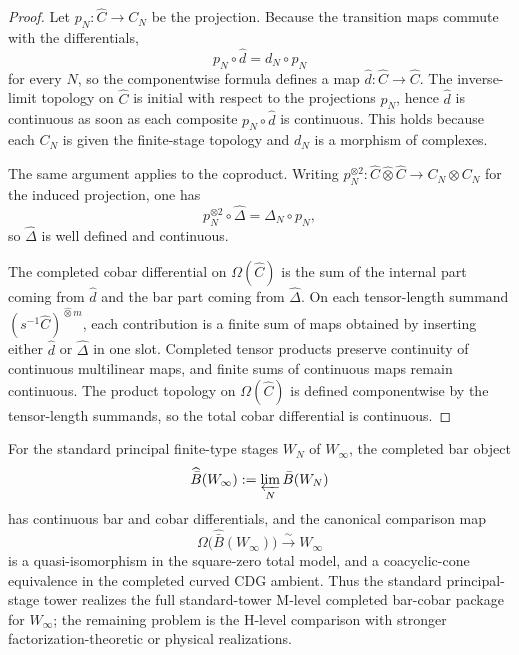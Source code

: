 \begin{proof}
Let $p_N\colon \widehat C \to C_N$ be the projection. Because the
transition maps commute with the differentials,
\[
p_N \circ \widehat d = d_N \circ p_N
\]
for every $N$, so the componentwise formula defines a map
$\widehat d\colon \widehat C \to \widehat C$. The inverse-limit
topology on $\widehat C$ is initial with respect to the projections
$p_N$, hence $\widehat d$ is continuous as soon as each composite
$p_N \circ \widehat d$ is continuous. This holds because each $C_N$ is
given the finite-stage topology and $d_N$ is a morphism of complexes.

The same argument applies to the coproduct. Writing
$p_N^{\otimes 2}\colon \widehat C \widehat\otimes \widehat C \to
C_N\otimes C_N$ for the induced projection, one has
\[
p_N^{\otimes 2} \circ \widehat\Delta = \Delta_N \circ p_N,
\]
so $\widehat\Delta$ is well defined and continuous.

The completed cobar differential on $\Omega(\widehat C)$ is the sum of
the internal part coming from $\widehat d$ and the bar part coming from
$\widehat\Delta$. On each tensor-length summand
$(s^{-1}\widehat C)^{\widehat\otimes m}$, each contribution is a finite
sum of maps obtained by inserting either $\widehat d$ or
$\widehat\Delta$ in one slot. Completed tensor products preserve
continuity of continuous multilinear maps, and finite sums of
continuous maps remain continuous. The product topology on
$\Omega(\widehat C)$ is defined componentwise by the tensor-length
summands, so the total cobar differential is continuous.
\end{proof}

\begin{corollary}
\label{cor:winfty-standard-mc4-package}
For the standard principal finite-type stages $W_N$ of $W_\infty$, the
completed bar object
\[
\widehat{\bar B}(W_\infty) := \varprojlim_N \bar B(W_N)
\]
has continuous bar and cobar differentials, and the canonical
comparison map
\[
\Omega\bigl(\widehat{\bar B}(W_\infty)\bigr) \xrightarrow{\sim} W_\infty
\]
is a quasi-isomorphism in the square-zero total model, and a
coacyclic-cone equivalence in the completed curved CDG ambient.
Thus the standard principal-stage tower realizes the full
standard-tower M-level completed bar-cobar package for $W_\infty$; the
remaining problem is
the H-level comparison with stronger factorization-theoretic or
physical realizations.
\end{corollary}

